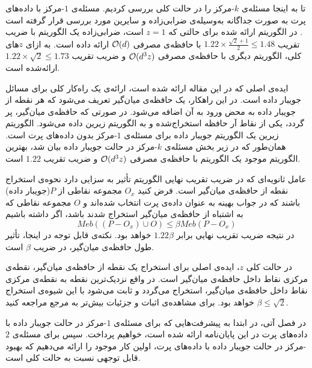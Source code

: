 تا به اینجا مسئله‌ی $k$-مرکز را در حالت کلی بررسی کردیم.
مسئله‌ی $1$-مرکز با داده‌های پرت به صورت جداگانه به‌وسیله‌ی ضرابی‌زاده و سایرین مورد بررسی قرار گرفته است .
در الگوریتم ارائه شده برای حالتی که $z = 1$ است، ضرابی‌زاده یک الگوریتم با ضریب تقریب $1.22 \times \frac{\sqrt{2} + 1}{2} \leq 1.48$ با حافظه‌ی مصرفی $\mathcal{O}(d)$ ارائه داده است.
به ازای $z$های کلی، الگوریتم دیگری با حافظه‌ی مصرفی $\mathcal{O}(d^3z)$ و ضریب تقریب $1.22 \times \sqrt{2} \leq 1.73$ ارائه‌شده است.

ایده‌ی اصلی که در این مقاله ارائه شده است، ارائه‌ی یک راه‌کار کلی برای مسائل جویبار داده است.
در این راهکار، یک حافظه‌ی میان‌گیر تعریف می‌شود که هر نقطه از جویبار داده به محض ورود به آن اضافه می‌شود.
در صورتی که حافظه‌ی میان‌گیر، پر گردد، یکی از نقاط آر حافظه استخراج‌شده و به الگوریتم زیرین داده می‌شود.
الگوریتم زیرین یک الگوریتم جویبار داده برای مسئله‌ی $1$-مرکز بدون داده‌های پرت است.
همان‌طور که در زیر بخش مسئله‌ی $k$-مرکز در حالت جویبار داده بیان شد، بهترین الگوریتم موجود یک الگوریتم با حافظه‌ی مصرفی $\mathcal{O}(d^3z)$ و ضریب تقریب $1.22$ است.

عامل ثانویه‌ای که در ضریب تقریب نهایی الگوریتم تأثیر به سزایی دارد نحوه‌ی استخراج نقطه از حافظه‌ی میان‌گیر است.
فرض کنید $O_x$ مجموعه نقاطی از $P$(جویبار داده) باشند که در جواب بهینه به عنوان داده‌ی پرت انتخاب شده‌اند و $O$ مجموعه نقاطی که به اشتباه از حافظه‌ی میان‌گیر استخراج شدند باشد، اگر داشته باشیم
$$Meb((P - O_x) \cup O) \leq \beta Meb(P - O_x)$$
در نتیجه ضریب تقریب نهایی برابر $1.22 \beta$ خواهد بود.
نکته‌ی قابل توجه در اینجا، تأثیر طول حافظه‌ی میان‌گیر، در ضریب $\beta$ است.

در حالت کلی $z$، ایده‌ی اصلی برای استخراج یک نقطه از حافظه‌ی میان‌گیر، نقطه‌ی مرکزی نقاط داخل حافظه‌ی میان‌گیر است.
در واقع نزدیک‌ترین نقطه به نقطه‌ی مرکزی نقاط داخل حافظه‌ی میان‌گیر، استخراج می‌گردد و ثابت می‌شود با این شیوه‌ی استخراج $\beta \leq \sqrt{2}$ خواهد بود.
برای مشاهده‌ی اثبات و جزئیات بیش‌تر به مرجع  مراجعه کنید.

در فصل آتی، در ابتدا به پیشرفت‌هایی که برای مسئله‌ی $1$-مرکز در حالت جویبار داده با داده‌های پرت در این پایان‌نامه ارائه شده است، خواهیم پرداخت.
سپس برای مسئله‌ی $2$-مرکز در حالت جویبار داده با داده‌های پرت، اولین کار موجود را ارائه می‌دهیم که بهبود قابل توجهی نسبت به حالت کلی است.

